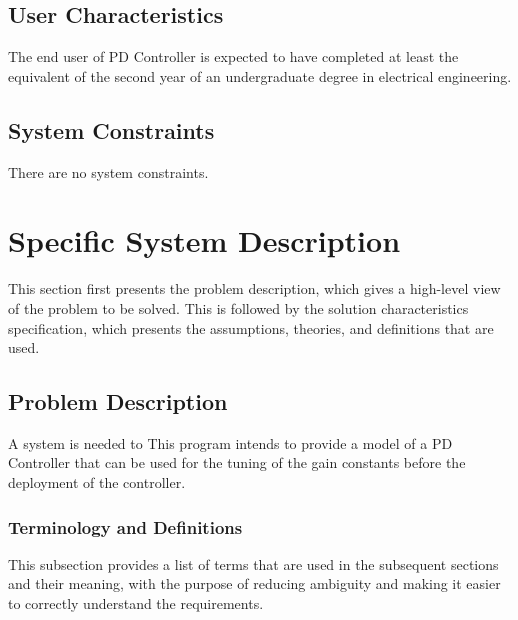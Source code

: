 \documentclass[12pt]{article}
\begin{document}
\subsection{User Characteristics}
\label{Sec:UserChars}
The end user of  PD Controller  is expected to have completed at least the equivalent of the second year of an undergraduate degree in electrical engineering.

\subsection{System Constraints}
\label{Sec:SysConstraints}
There are no system constraints.

\section{Specific System Description}
\label{Sec:SpecSystDesc}
This section first presents the problem description, which gives a high-level view of the problem to be solved. This is followed by the solution characteristics specification, which presents the assumptions, theories, and definitions that are used.

\subsection{Problem Description}
\label{Sec:ProbDesc}
A system is needed to This program intends to provide a model of a PD Controller  that can be used for the tuning of the gain constants before  the deployment of the controller.

\subsubsection{Terminology and Definitions}
\label{Sec:TermDefs}
This subsection provides a list of terms that are used in the subsequent sections and their meaning, with the purpose of reducing ambiguity and making it easier to correctly understand the requirements.
\end{document}
